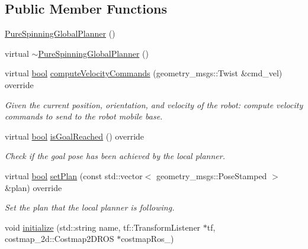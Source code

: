 \subsection*{Public Member Functions}
\begin{DoxyCompactItemize}
\item 
\hyperlink{classmove__base__z__client_1_1pure__spinning__global__planner_1_1PureSpinningGlobalPlanner_a8c75c60417dc9dacfabbc35a7f130bee}{Pure\+Spinning\+Global\+Planner} ()
\item 
virtual \hyperlink{classmove__base__z__client_1_1pure__spinning__global__planner_1_1PureSpinningGlobalPlanner_a224e7e61d65511adb92a56d8b8770859}{$\sim$\+Pure\+Spinning\+Global\+Planner} ()
\item 
virtual \hyperlink{classbool}{bool} \hyperlink{classmove__base__z__client_1_1pure__spinning__global__planner_1_1PureSpinningGlobalPlanner_a91836437532cd0f8dbeaaf37a2a46088}{compute\+Velocity\+Commands} (geometry\+\_\+msgs\+::\+Twist \&cmd\+\_\+vel) override
\begin{DoxyCompactList}\small\item\em Given the current position, orientation, and velocity of the robot\+: compute velocity commands to send to the robot mobile base. \end{DoxyCompactList}\item 
virtual \hyperlink{classbool}{bool} \hyperlink{classmove__base__z__client_1_1pure__spinning__global__planner_1_1PureSpinningGlobalPlanner_ab912f97ba1c2963d779a87af2d58e0c6}{is\+Goal\+Reached} () override
\begin{DoxyCompactList}\small\item\em Check if the goal pose has been achieved by the local planner. \end{DoxyCompactList}\item 
virtual \hyperlink{classbool}{bool} \hyperlink{classmove__base__z__client_1_1pure__spinning__global__planner_1_1PureSpinningGlobalPlanner_aa1182aa14139583b1c1994db4c92d502}{set\+Plan} (const std\+::vector$<$ geometry\+\_\+msgs\+::\+Pose\+Stamped $>$ \&plan) override
\begin{DoxyCompactList}\small\item\em Set the plan that the local planner is following. \end{DoxyCompactList}\item 
void \hyperlink{classmove__base__z__client_1_1pure__spinning__global__planner_1_1PureSpinningGlobalPlanner_a1186b2da8a77ad8ab0f9878de2a1db63}{initialize} (std\+::string name, tf\+::\+Transform\+Listener $\ast$tf, costmap\+\_\+2d\+::\+Costmap2\+D\+R\+OS $\ast$costmap\+Ros\+\_\+)

\end{DoxyCompactItemize}
